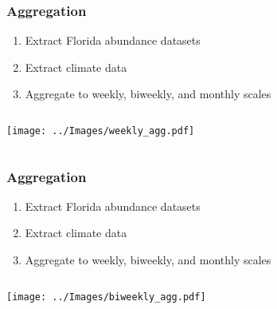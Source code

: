 \documentclass{beamer}
\begin{document}
\begin{frame}
\frametitle{Aggregation}

\begin{enumerate}
	\item Extract Florida abundance datasets 
	
	\item Extract climate data 
	
	\item Aggregate to weekly, biweekly, and monthly scales	
\end{enumerate}


\vspace{0.7cm}
\begin{columns}
	\begin{column}{0.7\textwidth}
		\texttt{[image: ../Images/weekly\_agg.pdf]}
	\end{column}
	\begin{column}{0.3\textwidth}
		
	\end{column}
\end{columns}

\end{frame}

\begin{frame}
\frametitle{Aggregation}

\begin{enumerate}
	\item Extract Florida abundance datasets 
	
	\item Extract climate data 
	
	\item Aggregate to weekly, biweekly, and monthly scales	
\end{enumerate}


\vspace{0.7cm}
\begin{columns}
	\begin{column}{0.7\textwidth}
		\texttt{[image: ../Images/biweekly\_agg.pdf]}
	\end{column}
	\begin{column}{0.3\textwidth}
		
	\end{column}
\end{columns}

\end{frame}
\end{document}
